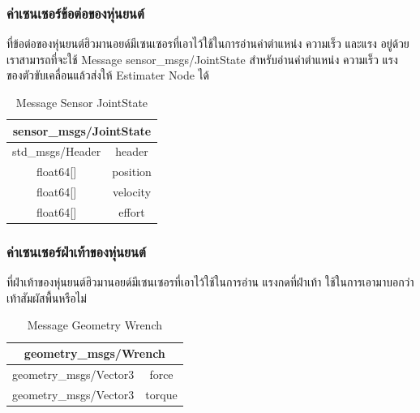 \subsubsection*{ค่าเซนเซอร์ข้อต่อของหุ่นยนต์}
ที่ข้อต่อของหุ่นยนต์ฮิวมานอยด์มีเซนเซอรที่เอาไว้ใช้ในการอ่านค่าตำแหน่ง ความเร็ว และแรง อยู่ด้วย
เราสามารถที่จะใช้ Message sensor\_msgs/JointState สำหรับอ่านค่าตำแหน่ง ความเร็ว แรง
ของตัวขับเคลื่อนแล้วส่งให้ Estimater Node ได้
\begin{table}[h!]
	\centering
	\begin{tabular}{| c | c |}
		\hline
		\multicolumn{2}{|c|}{sensor\_msgs/JointState}\\
		\hline
		std\_msgs/Header & header \\
		float64[] & position \\
		float64[] & velocity \\
		float64[] & effort \\
		\hline
	\end{tabular}
	\caption{Message Sensor JointState}
	\label{tab:sensor_jointstate}
\end{table}

\subsubsection*{ค่าเซนเซอร์ฝ่าเท้าของหุ่นยนต์}
ที่ฝ่าเท้าของหุ่นยนต์ฮิวมานอยด์มีเซนเซอรที่เอาไว้ใช้ในการอ่าน แรงกดที่ฝ่าเท้า ใช้ในการเอามาบอกว่าเท้าสัมผัสพื้นหรือไม่
\begin{table}[h!]
	\centering
	\begin{tabular}{| c | c |}
		\hline
		\multicolumn{2}{|c|}{geometry\_msgs/Wrench}\\
		\hline
		geometry\_msgs/Vector3 & force \\
		geometry\_msgs/Vector3 & torque \\
		\hline
	\end{tabular}
	\caption{Message Geometry Wrench}
	\label{tab:geometry_wrench}
\end{table}

\clearpage
